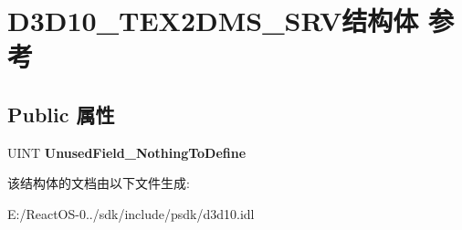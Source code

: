 \hypertarget{struct_d3_d10___t_e_x2_d_m_s___s_r_v}{}\section{D3\+D10\+\_\+\+T\+E\+X2\+D\+M\+S\+\_\+\+S\+R\+V结构体 参考}
\label{struct_d3_d10___t_e_x2_d_m_s___s_r_v}
\subsection*{Public 属性}
\begin{DoxyCompactItemize}
\item 
\mbox{\label{struct_d3_d10___t_e_x2_d_m_s___s_r_v_a5e39fb9a363ccf94529e6ca394f5bbff}} 
U\+I\+NT {\bfseries Unused\+Field\+\_\+\+Nothing\+To\+Define}
\end{DoxyCompactItemize}


该结构体的文档由以下文件生成\+:\begin{DoxyCompactItemize}
\item 
E\+:/\+React\+O\+S-\/0../sdk/include/psdk/d3d10.\+idl\end{DoxyCompactItemize}
